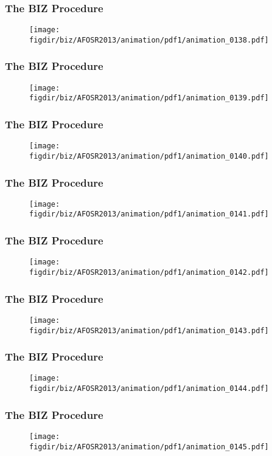 \documentclass[13pt]{beamer}
\newcommand{\figdir}{../../fig}
\begin{document}
{\begin{frame}\frametitle{The BIZ Procedure}\begin{figure}\texttt{[image: \\figdir/biz/AFOSR2013/animation/pdf1/animation\_0138.pdf]}\end{figure}\end{frame}
\begin{frame}\frametitle{The BIZ Procedure}\begin{figure}\texttt{[image: \\figdir/biz/AFOSR2013/animation/pdf1/animation\_0139.pdf]}\end{figure}\end{frame}
\begin{frame}\frametitle{The BIZ Procedure}\begin{figure}\texttt{[image: \\figdir/biz/AFOSR2013/animation/pdf1/animation\_0140.pdf]}\end{figure}\end{frame}
\begin{frame}\frametitle{The BIZ Procedure}\begin{figure}\texttt{[image: \\figdir/biz/AFOSR2013/animation/pdf1/animation\_0141.pdf]}\end{figure}\end{frame}
\begin{frame}\frametitle{The BIZ Procedure}\begin{figure}\texttt{[image: \\figdir/biz/AFOSR2013/animation/pdf1/animation\_0142.pdf]}\end{figure}\end{frame}
\begin{frame}\frametitle{The BIZ Procedure}\begin{figure}\texttt{[image: \\figdir/biz/AFOSR2013/animation/pdf1/animation\_0143.pdf]}\end{figure}\end{frame}
\begin{frame}\frametitle{The BIZ Procedure}\begin{figure}\texttt{[image: \\figdir/biz/AFOSR2013/animation/pdf1/animation\_0144.pdf]}\end{figure}\end{frame}
\begin{frame}\frametitle{The BIZ Procedure}\begin{figure}\texttt{[image: \\figdir/biz/AFOSR2013/animation/pdf1/animation\_0145.pdf]}\end{figure}\end{frame}
}
\end{document}
